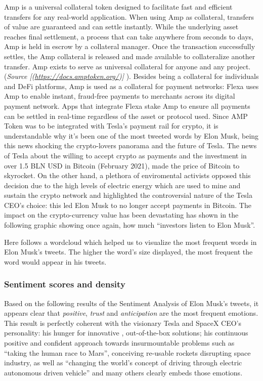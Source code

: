 \documentclass[
]{article}
\begin{document}
Amp is a universal collateral token designed to facilitate fast and
efficient transfers for any real-world application. When using Amp as
collateral, transfers of value are guaranteed and can settle instantly.
While the underlying asset reaches final settlement, a process that can
take anywhere from seconds to days, Amp is held in escrow by a
collateral manager. Once the transaction successfully settles, the Amp
collateral is released and made available to collateralize another
transfer. Amp exists to serve as universal collateral for anyone and any
project. (\emph{Source {[}(\url{https://docs.amptoken.org/}){]}} ).
Besides being a collateral for individuals and DeFi platforms, Amp is
used as a collateral for payment networks: Flexa uses Amp to enable
instant, fraud-free payments to merchants across its digital payment
network. Apps that integrate Flexa stake Amp to ensure all payments can
be settled in real-time regardless of the asset or protocol used. Since
AMP Token was to be integrated with Tesla's payment rail for crypto, it
is understandable why it's been one of the most tweeted words by Elon
Musk, being this news shocking the crypto-lovers panorama and the future
of Tesla. The news of Tesla about the willing to accept crypto as
payments and the investment in over 1.5 BLN USD in Bitcoin (February
2021), made the price of Bitcoin to skyrocket. On the other hand, a
plethora of enviromental activists opposed this decision due to the high
levels of electric energy which are used to mine and sustain the crypto
network and highlighted the controversial nature of the Tesla CEO's
choice: this led Elon Musk to no longer accept payments in Bitcoin. The
impact on the crypto-currency value has been devastating has shown in
the following graphic showing once again, how much ``investors listen to
Elon Musk''.

Here follows a wordcloud which helped us to visualize the most frequent
words in Elon Musk's tweets. The higher the word's size displayed, the
most frequent the word would appear in his tweets.

\hypertarget{sentiment-scores-and-density}{%
\subsubsection{Sentiment scores and
density}\label{sentiment-scores-and-density}}

Based on the following results of the Sentiment Analysis of Elon Musk's
tweets, it appears clear that \emph{positive}, \emph{trust} and
\emph{anticipation} are the most frequent emotions. This result is
perfectly coherent with the visionary Tesla and SpaceX CEO's
personality: his hunger for innovative , out-of-the-box solutions; his
continuous positive and confident approach towards insurmountable
problems such as ``taking the human race to Mars'', conceiving re-usable
rockets disrupting space industry, as well as ``changing the world's
concept of driving through electric autonomous driven vehicle'' and many
others clearly embeds those emotions.
\end{document}
